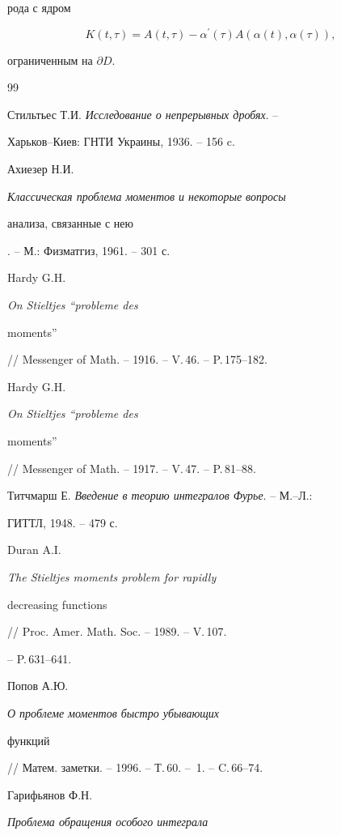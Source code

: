 рода с ядром


$$


K(t,\tau)=A(t,\tau)-\alpha^\prime(\tau)A(\alpha(t),\alpha(\tau)),


$$


ограниченным на $\partial D$.





\begin{thebibliography}{99}







Стильтьес Т.И. {\em Исследование о непрерывных дробях}. --


Харьков--Киев: ГНТИ Украины, 1936. -- 156 c.




Ахиезер Н.И. {\em Классическая проблема моментов и некоторые вопросы


анализа, связанные с нею}. -- М.: Физматгиз, 1961. -- 301 с.




Hardy G.H. {\em On Stieltjes ``probleme des


moments''} // Messenger of Math. -- 1916. -- V.\,46. -- P.\,175--182.




Hardy G.H. {\em On Stieltjes ``probleme des


moments''} // Messenger of Math. -- 1917. -- V.\,47. -- P.\,81--88.




Титчмарш Е. {\em Введение в теорию интегралов Фурье}. -- М.--Л.:


ГИТТЛ, 1948. -- 479 с.




Duran A.I. {\em The Stieltjes moments problem for rapidly


decreasing functions} // Proc. Amer. Math. Soc. -- 1989. -- V.\,107.


-- P.\,631--641.




Попов А.Ю. {\em О проблеме моментов быстро убывающих


функций} // Матем. заметки. -- 1996. -- Т.\,60. -- \No\,1. -- C.\,66--74.




Гарифьянов Ф.Н. {\em Проблема обращения особого интеграла


}
\end{thebibliography}
